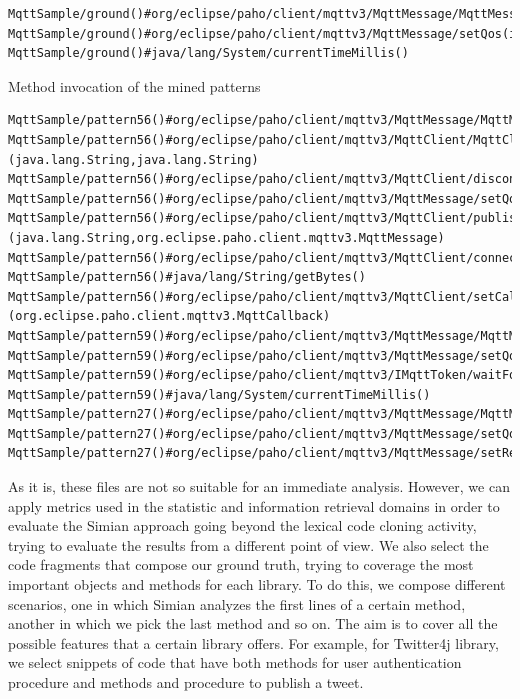 \begin{lstlisting}
MqttSample/ground()#org/eclipse/paho/client/mqttv3/MqttMessage/MqttMessage(byte[])
MqttSample/ground()#org/eclipse/paho/client/mqttv3/MqttMessage/setQos(int)
MqttSample/ground()#java/lang/System/currentTimeMillis()
\end{lstlisting}

\vspace{5mm}
\noindent
Method invocation of the mined patterns
\begin{lstlisting}
MqttSample/pattern56()#org/eclipse/paho/client/mqttv3/MqttMessage/MqttMessage(byte[])
MqttSample/pattern56()#org/eclipse/paho/client/mqttv3/MqttClient/MqttClient
(java.lang.String,java.lang.String)
MqttSample/pattern56()#org/eclipse/paho/client/mqttv3/MqttClient/disconnect()
MqttSample/pattern56()#org/eclipse/paho/client/mqttv3/MqttMessage/setQos(int)
MqttSample/pattern56()#org/eclipse/paho/client/mqttv3/MqttClient/publish
(java.lang.String,org.eclipse.paho.client.mqttv3.MqttMessage)
MqttSample/pattern56()#org/eclipse/paho/client/mqttv3/MqttClient/connect()
MqttSample/pattern56()#java/lang/String/getBytes()
MqttSample/pattern56()#org/eclipse/paho/client/mqttv3/MqttClient/setCallback
(org.eclipse.paho.client.mqttv3.MqttCallback)
MqttSample/pattern59()#org/eclipse/paho/client/mqttv3/MqttMessage/MqttMessage(byte[])
MqttSample/pattern59()#org/eclipse/paho/client/mqttv3/MqttMessage/setQos(int)
MqttSample/pattern59()#org/eclipse/paho/client/mqttv3/IMqttToken/waitForCompletion()
MqttSample/pattern59()#java/lang/System/currentTimeMillis()
MqttSample/pattern27()#org/eclipse/paho/client/mqttv3/MqttMessage/MqttMessage(byte[])
MqttSample/pattern27()#org/eclipse/paho/client/mqttv3/MqttMessage/setQos(int)
MqttSample/pattern27()#org/eclipse/paho/client/mqttv3/MqttMessage/setRetained(boolean)

\end{lstlisting}
As it is, these files are not so suitable for an immediate analysis. However, we can apply metrics used in the statistic and information retrieval domains in order to evaluate the Simian approach going beyond the lexical code cloning activity, trying to evaluate the results from a different point of view.
We also select the code fragments that compose our ground truth, trying to coverage the most important objects and methods for each library. To do this, we compose different scenarios, one in which Simian analyzes the first lines of a certain method, another in which we pick the last method and so on. The aim is to cover all the possible features that a certain library offers. For example, for Twitter4j library, we select snippets of code that have both methods for user authentication procedure and methods and procedure to publish a tweet.
